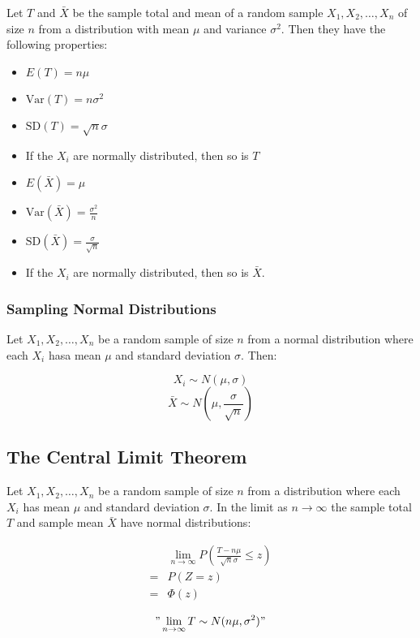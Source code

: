Let $T$ and $\bar{X}$ be the sample total and mean of a random sample $X_1,X_2,\ldots,X_n$ of size $n$ from a distribution with mean $\mu$ and variance $\sigma^2$.
Then they have the following properties:

\begin{itemize}
    \item $E(T) = n\mu$
    \item $\text{Var}(T)=n\sigma^2$
    \item $\text{SD}(T)=\sqrt{n}\sigma$
    \item If the $X_i$ are normally distributed, then so is $T$
    \item $E(\bar{X}) = \mu$
    \item $\text{Var}(\bar{X}) = \frac{\sigma^2}{n}$
    \item $\text{SD}(\bar{X}) = \frac{\sigma}{\sqrt{n}}$
    \item If the $X_i$ are normally distributed, then so is $\bar{X}$.
\end{itemize}

\subsubsection*{Sampling Normal Distributions}

Let $X_1,X_2,\ldots,X_n$ be a random sample of size $n$ from a normal distribution where each $X_i$ hasa mean $\mu$ and standard deviation $\sigma$.
Then:

$$ X_i \sim N(\mu,\sigma) $$
$$ \bar{X} \sim N(\mu,\frac{\sigma}{\sqrt{n}}) $$

\subsection*{The Central Limit Theorem}

Let $X_1,X_2,\ldots,X_n$ be a random sample of size $n$ from a distribution where each $X_i$ has mean $\mu$ and standard deviation $\sigma$. In the limit as $n\to \infty$ the sample total $T$ and sample mean $\bar{X}$ have normal distributions:

\begin{align*}
      & \lim_{n\to\infty} P\left(\frac{T-n\mu}{\sqrt{n} \sigma}\leq z\right) \\
    = & P(Z=z)                                                               \\
    = & \Phi(z)
\end{align*}

$$"\lim_{n\to\infty}T\sim N(n\mu,\sigma^2)"$$

